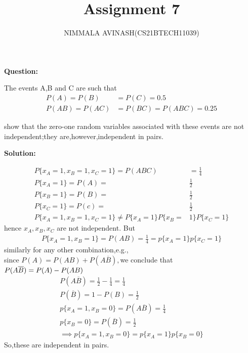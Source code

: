 \documentclass[journal,twocolumn]{IEEEtran}
\title{Assignment 7}
\author{NIMMALA AVINASH(CS21BTECH11039)}
\begin{document}
\maketitle

{\LARGE \textbf{Question:\\}}
\begin{large}
The events A,B and C are such that \\
\begin{align}
P(A)=P(B)&=P(C)=0.5\\
P(AB)=P(AC)&=P(BC)=P(ABC)=0.25
\end{align}

show that the zero-one random variables associated with these events are not independent;they are,however,independent in pairs.\\
\end{large}

{\LARGE \textbf{Solution:\\}}
\begin{large}
\begin{align}
P\{x_{A}=1,x_{B}=1,x_{C}=1\} = P(ABC)&=\frac{1}{4}\\
P\{x_{A}=1\} = P(A) =&\frac{1}{2}\\ P\{x_{B}=1\} = P(B) =& \frac{1}{2}\\
P\{x_{C}=1\}=P(c)=&\frac{1}{2}\\
P\{x_{A}=1,x_{B}=1,x_{C}=1\}\neq P\{x_{A}=1\}P\{x_{B}=&1\}P\{x_{C}=1\}
\end{align}
hence $ x_{A},x_{B},x_{C}$ are not independent. But\\
\begin{align}
P\{x_{A}=1,x_{B}=1\}=P(AB)=\frac{1}{4}=p\{x_{A}=1\}p\{x_{C}=1\}
\end{align}
similarly for any other combination,e.g.,\\since
$ P(A) = P(AB)+P(A\overline{B}),$we conclude that\\
$P(A\overline{B}) = P(A) - P(AB)\\$
\begin{align}
P(A\overline{B})=\frac{1}{2}-\frac{1}{4} = \frac{1}{4}\\
P(\overline{B})=1-P(B)=\frac{1}{2}\\
p\{x_{A}=1,x_{B}=0\}=P(A\overline{B})=\frac{1}{4}\\
p\{x_{B}=0\}=P(\overline{B})=\frac{1}{2} \\
\implies p\{x_{A}=1,x_{B}=0\}=p\{x_{A}=1\}p\{x_{B}=0\}
\end{align}
So,these are independent in pairs.\\
\end{large}
\end{document}
